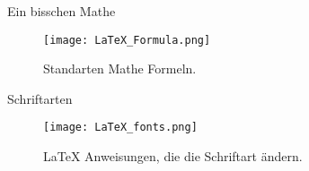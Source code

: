 \documentclass[a4paper, 12pt]{article}
\begin{document}

\faChevronCircleRight
\hspace{0.5cm}Ein bisschen Mathe
\begin{figure}[ht]
	\centering
	\captionsetup{justification=centering}
	\label{fig: formula}
	\texttt{[image: LaTeX\_Formula.png]}
	\caption[Formeln]{Standarten Mathe Formeln.}
\end{figure}
\pagebreak

\faChevronCircleRight
\hspace{0.5cm}Schriftarten
\begin{figure}[H]
	\centering
	\captionsetup{justification=centering}
	\label{fig: fonts}
	\texttt{[image: LaTeX\_fonts.png]}
	\caption[Formeln]{LaTeX Anweisungen, die die Schriftart ändern.}
\end{figure}
\end{document}
